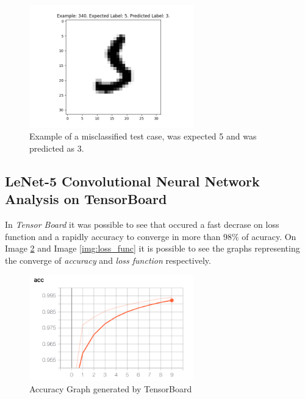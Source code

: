 \documentclass[journal]{IEEEtran}
\begin{document}
\begin{figure}
  \begin{center}
  \includegraphics[width=2.8in]{./../code/misclassified_image_340.png}
  \caption{Example of a misclassified test case, was expected 5 and was predicted as 3.}
  \label{img:misclassification_two}
  \end{center}
\end{figure}

\subsection{LeNet-5 Convolutional Neural Network Analysis on TensorBoard}

In \textit{Tensor Board} it was possible to see that occured a fast decrase on loss function and a rapidly accuracy to converge in more than 98\% of acuracy. On Image \ref{img:accuracy} and Image \ref{img:loss_func} it is possible to see the graphs representing the converge of \textit{accuracy} and \textit{loss function} respectively.

\begin{figure}
  \begin{center}
  \includegraphics[width=2.8in]{./../code/tensorboard/tensor_board_accuracy_graph.png}
  \caption{Accuracy Graph generated by TensorBoard}
  \label{img:accuracy}
  \end{center}
\end{figure}
\end{document}
